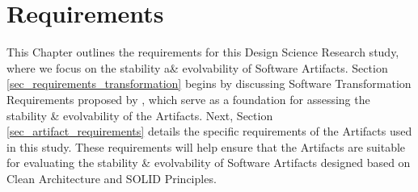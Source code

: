 \chapter{Requirements} \label{chap_requirements} 

This Chapter outlines the requirements for this Design Science Research study, where we
focus on the stability a\& evolvability of Software Artifacts. Section
\ref{sec_requirements_transformation} begins by discussing Software Transformation
Requirements proposed by \textcite{mannaert_normalized_2016}, which serve as a foundation
for assessing the stability \& evolvability of the Artifacts. Next, Section
\ref{sec_artifact_requirements} details the specific requirements of the Artifacts used in
this study. These requirements will help ensure that the Artifacts are suitable for
evaluating the stability \& evolvability of Software Artifacts designed based on Clean
Architecture and SOLID Principles.



